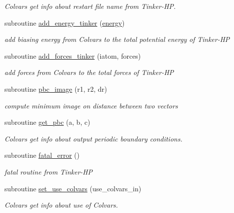 \begin{DoxyCompactItemize}
\begin{DoxyCompactList}\small\item\em Colvars get info about restart file name from Tinker-\/\-H\-P. \end{DoxyCompactList}\item 
subroutine \hyperlink{MOD__colvars_8f90_ae227b4df03c8f84f0b86ccfdc8909154}{add\-\_\-energy\-\_\-tinker} (\hyperlink{energy_8f90_a1aa8c625eb0a3eea79ed1a8047707c94}{energy})
\begin{DoxyCompactList}\small\item\em add biasing energy from Colvars to the total potential energy of Tinker-\/\-H\-P \end{DoxyCompactList}\item 
subroutine \hyperlink{MOD__colvars_8f90_acf84fe7983737cb52ab061e713cf3768}{add\-\_\-forces\-\_\-tinker} (iatom, forces)
\begin{DoxyCompactList}\small\item\em add forces from Colvars to the total forces of Tinker-\/\-H\-P \end{DoxyCompactList}\item 
subroutine \hyperlink{MOD__colvars_8f90_a45e608998392ca07400b1f1022ad761f}{pbc\-\_\-image} (r1, r2, dr)
\begin{DoxyCompactList}\small\item\em compute minimum image on distance between two vectors \end{DoxyCompactList}\item 
subroutine \hyperlink{MOD__colvars_8f90_aa97e34eac867be2cdf6da50a20c93d06}{get\-\_\-pbc} (a, b, c)
\begin{DoxyCompactList}\small\item\em Colvars get info about output periodic boundary conditions. \end{DoxyCompactList}\item 
subroutine \hyperlink{MOD__colvars_8f90_a4e63dc48a79b628e4d57009199a13ad0}{fatal\-\_\-error} ()
\begin{DoxyCompactList}\small\item\em fatal routine from Tinker-\/\-H\-P \end{DoxyCompactList}\item 
subroutine \hyperlink{MOD__colvars_8f90_ac681b112205a4ab6fccd8ea5fbea4083}{set\-\_\-use\-\_\-colvars} (use\-\_\-colvars\-\_\-in)
\begin{DoxyCompactList}\small\item\em Colvars get info about use of Colvars. \end{DoxyCompactList}\item 

\end{DoxyCompactItemize}
